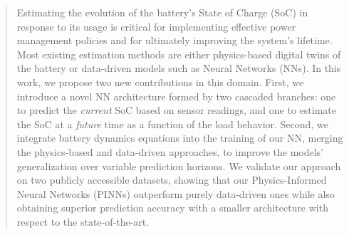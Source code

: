 \begin{abstract}
Estimating the evolution of the battery's State of Charge (SoC) in response to its usage is critical for implementing effective power management policies and for ultimately improving the system's lifetime.
Most existing estimation methods are either physics-based digital twins of the battery or data-driven models such as Neural Networks (NNs).
In this work, we propose two new contributions in this domain. First, we introduce a novel NN architecture formed by two cascaded branches: one to predict the \textit{current} SoC based on sensor readings, and one to estimate the SoC at a \textit{future} time as a function of the load behavior. Second, we integrate battery dynamics equations into the training of our NN, merging the physics-based and data-driven approaches, to improve the models' generalization over variable prediction horizons. 
We validate our approach on two publicly accessible datasets, showing that our Physics-Informed Neural Networks (PINNs) outperform purely data-driven ones while also obtaining superior prediction accuracy with a smaller architecture with respect to the state-of-the-art.  





\end{abstract}
